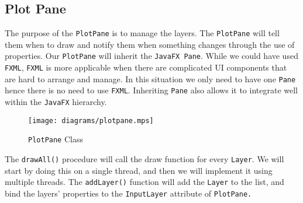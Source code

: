 \documentclass[../../../../../main.tex]{subfiles}
\begin{document}
\subsection{Plot Pane}
The purpose of the \texttt{PlotPane} is to manage the layers. The \texttt{PlotPane} will tell them when to draw and notify them when something changes through the use of properties. Our \texttt{PlotPane} will inherit the \texttt{JavaFX Pane}. While we could have used \texttt{FXML}, \texttt{FXML} is more applicable when there are complicated UI components that are hard to arrange and manage. In this situation we only need to have one \texttt{Pane} hence there is no need to use \texttt{FXML}. Inheriting \texttt{Pane} also allows it to integrate well within the \texttt{JavaFX} hierarchy.

\begin{figure}[H]
	\centering
	\texttt{[image: diagrams/plotpane.mps]}
	\caption{\texttt{PlotPane} Class}
\end{figure}

The \texttt{drawAll()} procedure will call the draw function for every \texttt{Layer}. We will start by doing this on a single thread, and then we will implement it using multiple threads.  The \texttt{addLayer()} function will add the \texttt{Layer} to the list, and bind the layers' properties to the \texttt{InputLayer} attribute of \texttt{PlotPane.}
\newpage
\end{document}
